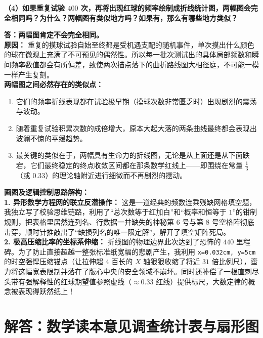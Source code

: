 \textbf{（4）如果重复试验 $400$ 次，再将出现红球的频率绘制成折线统计图，两幅图会完全相同吗？为什么？两幅图有类似地方吗？如果有，那么有哪些地方类似？}

\vspace{0.2cm}
\textbf{答：两幅图肯定不会完全相同。}\\
\textbf{原因：} 重复的摸球试验自始至终都是受机遇支配的随机事件，单次摸出什么颜色的球在微观上充满了不可预见的偶然性。所以每一批次测试出的具体局部频数和瞬间频率数值都会有所偏差，致使两次描点落下的曲折路线图大相径庭，不可能一模一样产生复刻。\\
\textbf{两幅图之间必然存在的类似点：} 
\begin{enumerate}
    \item 它们的频率折线表现都在试验极早期（摸球次数非常匮乏时）出现剧烈的震荡与波动。
    \item 随着重复试验积累次数的成倍增大，原本大起大落的两条曲线最终都会表现出波澜不惊的平缓趋势。
    \item 最关键的类似在于，两幅具有生命力的折线图，无论是从上面还是从下面跌宕，它们最终稳定的终点收敛区间都在那条数学红线上——即围绕在常量 $\frac{1}{3}$（或 $0.33$）的理论轴附近进行细微而不再剧烈的摆动。
\end{enumerate}

\vspace{0.6cm}

{\small\color{blue!70!black}
\textbf{画图及逻辑控制思路解构：}\\
\textbf{1. 异形数学方程网的联立反潜操作：} 这是一道经典的频数连乘残缺网格填空题，我独立写了校验思维链路，利用了“总次数等于红加白”和“概率和恒等于 $1$”的钳制规则，把表格里居然连列名、行数据一并缺失的神秘第 $6$ 号与第 $8$ 号空格阵彻底击穿，顺时针推敲出了“缺损列名的唯一限定解”，解开了填空矩阵死局。\\
\textbf{2. 极高压缩比率的坐标系伸缩：} 折线图的物理边界此次达到了恐怖的 $440$ 里程碑。为了防止直接超越一整张标准纸宽幅的悲剧产生，我利用 \texttt{x=0.032cm, y=5cm} 的时空强悍压缩锚点（让拉伸超 $4$ 百长的 $X$ 轴狠狠收缩了将近 $31$ 倍比例尺），蛮力将这幅宽表限制并落在了版心中央的安全领域不崩坏。同时还补偿了一根直刺尽头带有强解释性的红球期望值参照虚线（$\approx 0.33$ 红线）提供标尺，大数定律的概念被表现得跃然纸上！
}


\newpage



\section{解答：数学读本意见调查统计表与扇形图}

